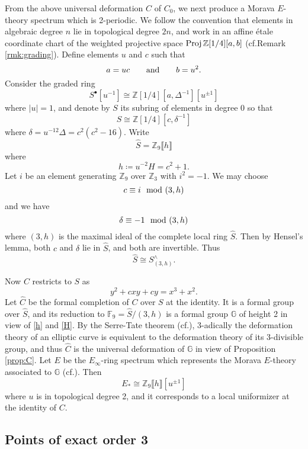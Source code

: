 \documentclass{gtpart}
\theoremstyle{definition}
\theoremstyle{remark}
\newcommand{\mb}[1]{\mathbb{#1}}
\newcommand{\Proj}{{\rm Proj\thinspace}}
\newcommand{\cf}{cf.\thinspace}
\newcommand{\BF}{{\mb F}}
\newcommand{\BG}{{\mb G}}
\newcommand{\BZ}{{\mb Z}}
\newcommand{\HC}{\widehat{C}}
\newcommand{\HS}{\widehat{S}}
\newcommand{\md}{~~{\rm mod}~}
\newcommand{\ad}{{\rm and}}
\newcommand{\s}{S^\bullet}
\begin{document}
From the above universal deformation $C$ of $C_0$, we next produce a Morava $E$-theory spectrum which is 2-periodic.  
We follow the convention that elements in algebraic degree $n$ lie in topological degree $2n$, and work in an affine \'etale coordinate chart of 
the weighted projective space $\Proj \BZ [1/4] [a, b]$ (\cf Remark \ref{rmk:grading}).  
Define elements $u$ and $c$ such that 
\[
 a = u c \qquad \ad \qquad b = u^2.  
\]
Consider the graded ring 
\[
 \s [u^{-1}] \cong \BZ [1/4] [a, \Delta^{-1}] [u^{\pm1}] 
\]
where $|u| = 1$, and denote by $S$ its subring of elements in degree 0 so that 
\begin{equation}
\label{S}
 S \cong \BZ [1/4] [c, \delta^{-1}] 
\end{equation}
where $\delta = u^{-12} \Delta = c^2 (c^2 - 16)$.  Write 
\[
 \HS = \BZ_9 \llbracket h \rrbracket 
\]
where 
\begin{equation}
\label{h}
 h \coloneqq u^{-2} H = c^2 + 1.  
\end{equation}
Let $i$ be an element generating $\BZ_9$ over $\BZ_3$ with $i^2 = -1$.  
We may choose 
\[
 c \equiv i \md (3,h) 
\]
and we have 
\[
 \delta \equiv -1 \md (3,h) 
\]
where $(3,h)$ is the maximal ideal of the complete local ring $\HS$.  
Then by Hensel's lemma, both $c$ and $\delta$ lie in $\HS$, and both are invertible.  Thus 
\[
 \HS \cong S_{(3,h)}^\wedge.  
\]

Now $C$ restricts to $S$ as 
\begin{equation}
\label{Cc}
 y^2 + c x y + c y = x^3 + x^2.  
\end{equation}
Let $\HC$ be the formal completion of $C$ over $S$ at the identity.  
It is a formal group over $\HS$, and its reduction to $\BF_9 = \HS / (3,h)$ 
is a formal group $\BG$ of height 2 in view of \eqref{h} and \eqref{H}.  
By the Serre-Tate theorem (\cf \cite[2.9.1]{KM}), 
3-adically the deformation theory of an elliptic curve is equivalent to 
the deformation theory of its 3-divisible group, 
and thus $\HC$ is the universal deformation of $\BG$ in view of Proposition \ref{prop:C}.  
Let $E$ be the $E_\infty$-ring spectrum which represents the Morava $E$-theory 
associated to $\BG$ (\cf \cite[Corollary 7.6]{GH}).  Then 
\[
 E_* \cong \BZ_9 \llbracket h \rrbracket [u^{\pm 1}] 
\]
where $u$ is in topological degree 2, and it corresponds to a local uniformizer at the identity of $C$.  


\subsection{Points of exact order 3}
\end{document}
